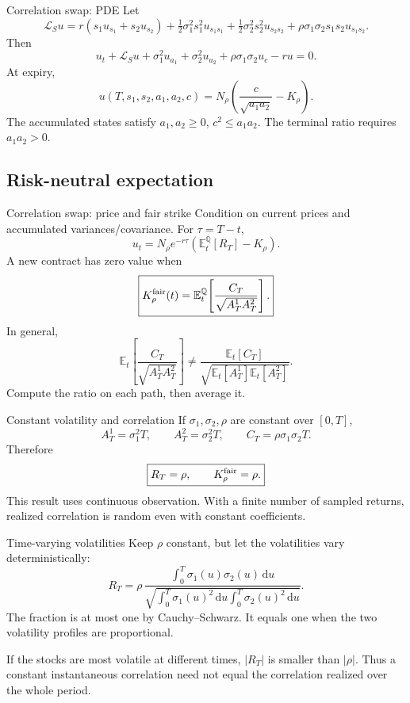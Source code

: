 \documentclass[handout,10pt,t,aspectratio=169]{beamer}
\newcommand{\E}{\mathbb E}
\newcommand{\Q}{\mathbb Q}
\newcommand{\dd}{\,\mathrm d}
\begin{document}
\begin{frame}{Correlation swap: PDE}
\small
Let
\[
 \mathcal L_Su=r(s_1u_{s_1}+s_2u_{s_2})
 +\tfrac12\sigma_1^2s_1^2u_{s_1s_1}
 +\tfrac12\sigma_2^2s_2^2u_{s_2s_2}
 +\rho\sigma_1\sigma_2s_1s_2u_{s_1s_2}.
\]
Then
\[
 \boxed{u_t+\mathcal L_Su+\sigma_1^2u_{a_1}+\sigma_2^2u_{a_2}
 +\rho\sigma_1\sigma_2u_c-ru=0.}
\]
At expiry,
\[
 u(T,s_1,s_2,a_1,a_2,c)=N_\rho\left(\frac c{\sqrt{a_1a_2}}-K_\rho\right).
\]
The accumulated states satisfy \(a_1,a_2\geq0\), \(c^2\leq a_1a_2\).
The terminal ratio requires \(a_1a_2>0\).
\end{frame}

\subsection{Risk-neutral expectation}

\begin{frame}{Correlation swap: price and fair strike}
\small
Condition on current prices and accumulated variances/covariance.
For \(\tau=T-t\),
\[
 u_t=N_\rho e^{-r\tau}\left(\E_t^\Q[R_T]-K_\rho\right).
\]
A new contract has zero value when
\[
 \boxed{K_\rho^{\rm fair}(t)=\E_t^\Q\!\left[
 \frac{C_T}{\sqrt{A_T^1A_T^2}}\right].}
\]
In general,
\[
 \E_t\!\left[\frac{C_T}{\sqrt{A_T^1A_T^2}}\right]
 \ne\frac{\E_t[C_T]}{\sqrt{\E_t[A_T^1]\E_t[A_T^2]}}.
\]
Compute the ratio on each path, then average it.
\end{frame}

\begin{frame}{Constant volatility and correlation}
\small
If \(\sigma_1,\sigma_2,\rho\) are constant over \([0,T]\),
\[
 A_T^1=\sigma_1^2T,\qquad A_T^2=\sigma_2^2T,\qquad
 C_T=\rho\sigma_1\sigma_2T.
\]
Therefore
\[
 \boxed{R_T=\rho,\qquad K_\rho^{\rm fair}=\rho.}
\]
This result uses continuous observation.
With a finite number of sampled returns, realized correlation is random
even with constant coefficients.
\end{frame}

\begin{frame}{Time-varying volatilities}
\small
Keep \(\rho\) constant, but let the volatilities vary deterministically:
\[
 R_T=\rho\,
 \frac{\int_0^T\sigma_1(u)\sigma_2(u)\dd u}
 {\sqrt{\int_0^T\sigma_1(u)^2\dd u\int_0^T\sigma_2(u)^2\dd u}}.
\]
The fraction is at most one by Cauchy--Schwarz.
It equals one when the two volatility profiles are proportional.

\medskip
If the stocks are most volatile at different times, \(|R_T|\) is smaller
than \(|\rho|\). Thus a constant instantaneous correlation need not equal
the correlation realized over the whole period.
\end{frame}
\end{document}

